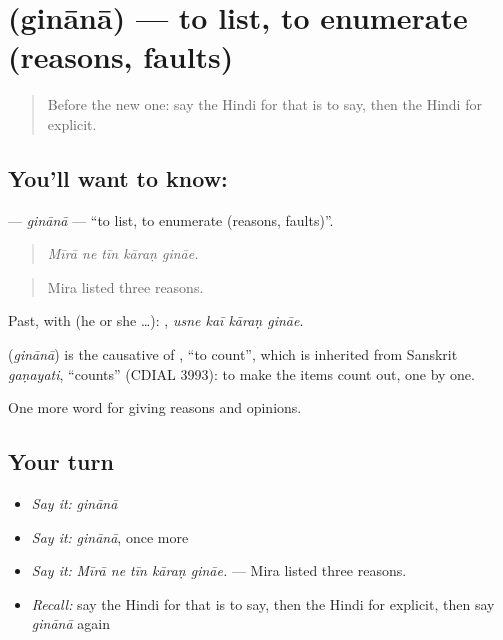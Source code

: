 \section[\texorpdfstring{\hi{गिनाना} (ginānā)}{गिनाना (ginānā)}]{ (ginānā) — to list, to enumerate (reasons, faults)}

\label{lesson:HI-C350-ginana}



\begin{quote}
Before the new one: say the Hindi for that is to say, then the Hindi for explicit.
\end{quote}

\subsection*{You'll want to know: }
\textbf{} — \emph{ginānā} — \textquotedblleft{}to list, to enumerate (reasons, faults)\textquotedblright{}.

\begin{quote}
    
\end{quote}

\begin{quote}
\emph{Mīrā ne tīn kāraṇ gināe.}
\end{quote}

\begin{quote}
Mira listed three reasons.
\end{quote}

Past, with  (he or she …):    , \emph{usne kaī kāraṇ gināe}.

\begin{cousinweb}
\textbf{} (\emph{ginānā}) is the causative of , \textquotedblleft{}to count\textquotedblright{}, which is inherited from Sanskrit \emph{gaṇayati}, \textquotedblleft{}counts\textquotedblright{} (CDIAL 3993): to make the items count out, one by one.
\end{cousinweb}

\begin{grammarlens}[title={What you've built}]
One more word for giving reasons and opinions.
\end{grammarlens}

\subsection*{Your turn}
\begin{itemize}
\raggedright
  \item \emph{Say it:} \emph{ginānā}
  \item \emph{Say it:} \emph{ginānā}, once more
  \item \emph{Say it:} \emph{Mīrā ne tīn kāraṇ gināe.} — Mira listed three reasons.
  \item \emph{Recall:} say the Hindi for that is to say, then the Hindi for explicit, then say \emph{ginānā} again
\end{itemize}

